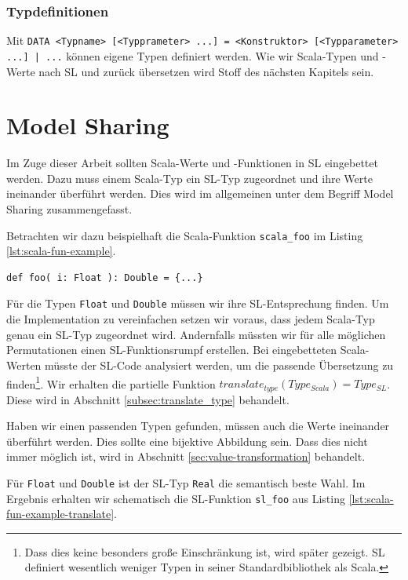 \documentclass[12pt,bibtotoc]{scrreprt}
\begin{document}
\subsection{Typdefinitionen}

Mit \lstinline!DATA <Typname> [<Typprameter> ...] = <Konstruktor> [<Typparameter> ...] | ...! können eigene Typen definiert werden. Wie wir Scala-Typen und -Werte nach SL und zurück übersetzen wird Stoff des nächsten Kapitels sein.

\chapter{Model Sharing}
\label{cha:model-sharing}

Im Zuge dieser Arbeit sollten Scala-Werte und -Funktionen in SL eingebettet werden. Dazu muss einem Scala-Typ ein SL-Typ zugeordnet und ihre Werte ineinander überführt werden. Dies wird im allgemeinen unter dem Begriff Model Sharing zusammengefasst.

Betrachten wir dazu beispielhaft die Scala-Funktion \lstinline!scala_foo! im Listing \ref{lst:scala-fun-example}.

\begin{lstlisting}[caption=Beispielfunktion scala\_foo, label=lst:scala-fun-example]
def foo( i: Float ): Double = {...}
\end{lstlisting}

Für die Typen \lstinline!Float! und \lstinline!Double! müssen wir ihre SL-Entsprechung finden. Um die Implementation zu vereinfachen setzen wir voraus, dass jedem Scala-Typ genau ein SL-Typ zugeordnet wird. Andernfalls müssten wir für alle möglichen Permutationen einen SL-Funktionsrumpf erstellen. Bei eingebetteten Scala-Werten müsste der SL-Code analysiert werden, um die passende Übersetzung zu finden\footnote{Dass dies keine besonders große Einschränkung ist, wird später gezeigt. SL definiert wesentlich weniger Typen in seiner Standardbibliothek als Scala. }. Wir erhalten die partielle Funktion $translate_{type}(Type_{Scala}) = Type_{SL}$. Diese wird in Abschnitt \ref{subsec:translate_type} behandelt.

Haben wir einen passenden Typen gefunden, müssen auch die Werte ineinander überführt werden. Dies sollte eine bijektive Abbildung sein. Dass dies nicht immer möglich ist, wird in Abschnitt \ref{sec:value-transformation} behandelt.

Für \lstinline!Float! und \lstinline!Double! ist der SL-Typ \lstinline!Real! die semantisch beste Wahl. Im Ergebnis erhalten wir schematisch die SL-Funktion \lstinline!sl_foo! aus Listing \ref{lst:scala-fun-example-translate}.
\end{document}
